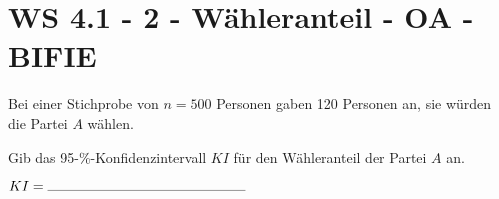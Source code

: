 \section{WS 4.1 - 2 - Wähleranteil - OA - BIFIE}

\begin{beispiel}[WS 4.1]{1} %
Bei einer Stichprobe von $n = 500$ Personen gaben 120 Personen an, sie würden die Partei $A$
wählen.

Gib das 95-\%-Konfidenzintervall $KI$ für den Wähleranteil der Partei $A$ an. \leer

$KI=\rule{5cm}{0.3pt}$	

\end{beispiel}	
